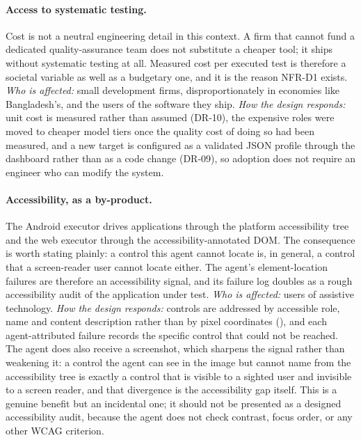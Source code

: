 \paragraph{Access to systematic testing.} Cost is not a neutral engineering
detail in this context. A firm that cannot fund a dedicated quality-assurance
team does not substitute a cheaper tool; it ships without systematic testing at
all. Measured cost per executed test is therefore a societal variable as well
as a budgetary one, and it is the reason NFR-D1 exists.
\emph{Who is affected:} small development firms, disproportionately in
economies like Bangladesh's, and the users of the software they ship.
\emph{How the design responds:} unit cost is measured rather than assumed
(DR-10), the expensive roles were moved to cheaper model tiers once the quality
cost of doing so had been measured, and a new target is configured as a
validated JSON profile through the dashboard rather than as a code change
(DR-09), so adoption does not require an engineer who can modify the system.

\paragraph{Accessibility, as a by-product.} The Android executor drives
applications through the platform accessibility tree and the web executor
through the accessibility-annotated DOM. The consequence is worth stating
plainly: a control this agent cannot locate is, in general, a control that a
screen-reader user cannot locate either. The agent's element-location failures
are therefore an accessibility signal, and its failure log doubles as a rough
accessibility audit of the application under test.
\emph{Who is affected:} users of assistive technology.
\emph{How the design responds:} controls are addressed by accessible role, name and content description rather than by pixel coordinates (), and each agent-attributed failure records the specific control that could not be reached. The agent does also receive a screenshot, which sharpens the signal rather than weakening it: a control the agent can see in the image but cannot name from the accessibility tree is exactly a control that is visible to a sighted user and invisible to a screen reader, and that divergence is the accessibility gap itself. This is a genuine benefit but an incidental
one; it should not be presented as a designed accessibility audit, because the
agent does not check contrast, focus order, or any other WCAG criterion.

